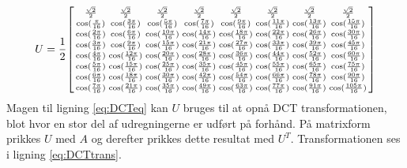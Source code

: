 \begin{equation}
U=\frac{1}{2}
\begin{bsmallmatrix}
	\frac{\sqrt{2}}{2}	& \frac{\sqrt{2}}{2}		& \frac{\sqrt{2}}{2}		& \frac{\sqrt{2}}{2}		& \frac{\sqrt{2}}{2}		& \frac{\sqrt{2}}{2}		& \frac{\sqrt{2}}{2}		& \frac{\sqrt{2}}{2}		\\
	\cos(\frac{\pi}{16})		& \cos(\frac{3\pi}{16})	& \cos(\frac{5\pi}{16})	& \cos(\frac{7\pi}{16})	& \cos(\frac{9\pi}{16})	& \cos(\frac{11\pi}{16})	& \cos(\frac{13\pi}{16})	& \cos(\frac{15\pi}{16})		\\
	\cos(\frac{2\pi}{16})	& \cos(\frac{6\pi}{16})	& \cos(\frac{10\pi}{16})	& \cos(\frac{14\pi}{16})	& \cos(\frac{18\pi}{16})	& \cos(\frac{22\pi}{16})	& \cos(\frac{26\pi}{16})	& \cos(\frac{30\pi}{16})		\\
	\cos(\frac{3\pi}{16})	& \cos(\frac{9\pi}{16})	& \cos(\frac{15\pi}{16})	& \cos(\frac{21\pi}{16})	& \cos(\frac{27\pi}{16})	& \cos(\frac{33\pi}{16})	& \cos(\frac{39\pi}{16})	& \cos(\frac{45\pi}{16})		\\
	\cos(\frac{4\pi}{16})	& \cos(\frac{12\pi}{16})	& \cos(\frac{20\pi}{16})	& \cos(\frac{28\pi}{16})	& \cos(\frac{36\pi}{16})	& \cos(\frac{44\pi}{16})	& \cos(\frac{52\pi}{16})	& \cos(\frac{60\pi}{16})		\\
	\cos(\frac{5\pi}{16})	& \cos(\frac{15\pi}{16})	& \cos(\frac{25\pi}{16})	& \cos(\frac{35\pi}{16})	& \cos(\frac{45\pi}{16})	& \cos(\frac{55\pi}{16})	& \cos(\frac{65\pi}{16})	& \cos(\frac{75\pi}{16})		\\
	\cos(\frac{6\pi}{16})	& \cos(\frac{18\pi}{16})	& \cos(\frac{30\pi}{16})	& \cos(\frac{42\pi}{16})	& \cos(\frac{54\pi}{16})	& \cos(\frac{66\pi}{16})	& \cos(\frac{78\pi}{16})	& \cos(\frac{90\pi}{16})		\\
	\cos(\frac{7\pi}{16})	& \cos(\frac{21\pi}{16})	& \cos(\frac{35\pi}{16})	& \cos(\frac{49\pi}{16})	& \cos(\frac{63\pi}{16})	& \cos(\frac{77\pi}{16})	& \cos(\frac{91\pi}{16})	& \cos(\frac{105\pi}{16})	\\
\end{bsmallmatrix}
\label{eq:DCTmatrix}
\end{equation}
Magen til ligning \vref{eq:DCTeq} kan $U$ bruges til at opnå DCT transformationen, blot hvor en stor del af udregningerne er udført på forhånd. På matrixform prikkes $U$ med $A$ og derefter prikkes dette resultat med $U^T$. Transformationen ses i ligning \vref{eq:DCTtrans}. %
